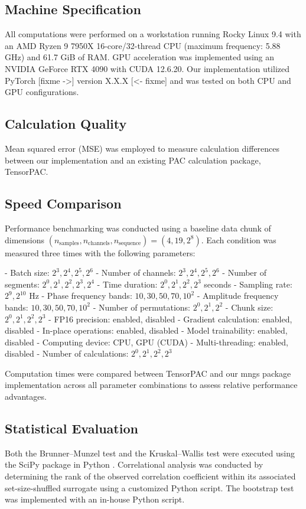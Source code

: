 \subsection{Machine Specification}
All computations were performed on a workstation running Rocky Linux 9.4 with an AMD Ryzen 9 7950X 16-core/32-thread CPU (maximum frequency: 5.88 GHz) and 61.7 GiB of RAM. GPU acceleration was implemented using an NVIDIA GeForce RTX 4090 with CUDA 12.6.20. Our implementation utilized PyTorch [fixme ->] version X.X.X [<- fixme] and was tested on both CPU and GPU configurations.

\subsection{Calculation Quality}
Mean squared error (MSE) was employed to measure calculation differences between our implementation and an existing PAC calculation package, TensorPAC.


\subsection{Speed Comparison}
Performance benchmarking was conducted using a baseline data chunk of dimensions $(n_\text{samples}, n_\text{channels}, n_\text{sequence}) = (4, 19, 2^8)$. Each condition was measured three times with the following parameters:

- Batch size: $2^3, 2^4, 2^5, 2^6$
- Number of channels: $2^3, 2^4, 2^5, 2^6$  
- Number of segments: $2^0, 2^1, 2^2, 2^3, 2^4$
- Time duration: $2^0, 2^1, 2^2, 2^3$ seconds
- Sampling rate: $2^9, 2^{10}$ Hz
- Phase frequency bands: $10, 30, 50, 70, 10^2$
- Amplitude frequency bands: $10, 30, 50, 70, 10^2$
- Number of permutations: $2^0, 2^1, 2^2$
- Chunk size: $2^0, 2^1, 2^2, 2^3$
- FP16 precision: enabled, disabled
- Gradient calculation: enabled, disabled
- In-place operations: enabled, disabled
- Model trainability: enabled, disabled
- Computing device: CPU, GPU (CUDA)
- Multi-threading: enabled, disabled
- Number of calculations: $2^0, 2^1, 2^2, 2^3$

Computation times were compared between TensorPAC and our mngs package implementation across all parameter combinations to assess relative performance advantages.



\subsection{Statistical Evaluation}
Both the Brunner--Munzel test and the Kruskal--Wallis test were executed using the SciPy package in Python \cite{virtanen_scipy_2020}. Correlational analysis was conducted by determining the rank of the observed correlation coefficient within its associated set-size-shuffled surrogate using a customized Python script. The bootstrap test was implemented with an in-house Python script.
\label{sec:methods}


